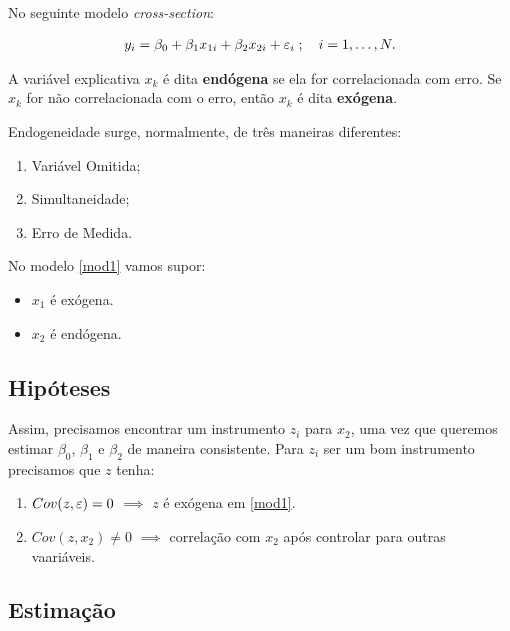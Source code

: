 \documentclass[11pt,oneside,a4paper]{article}
\numberwithin{equation}{section}
\begin{document}
No seguinte modelo \textit{cross-section}:

\vspace{-1 em}
\begin{align} \label{mod1}
	y_{i} = \beta_{0} + \beta_{1} x_{1i} + \beta_{2} x_{2i} + \varepsilon_{i}
	\; ; \quad i = 1, \dots, N.
\end{align}

\noindent
A variável explicativa $x_{k}$ é dita \textbf{endógena} se ela for correlacionada com erro.
Se $x_{k}$ for não correlacionada com o erro, então $x_{k}$ é dita \textbf{exógena}.

Endogeneidade surge, normalmente, de três maneiras diferentes:

\begin{enumerate}\itemsep0pt
	\item Variável Omitida;
	\item Simultaneidade;
	\item Erro de Medida.
\end{enumerate}

No modelo \eqref{mod1} vamos supor:

\begin{itemize}\itemsep0pt
	\item $x_{1}$ é exógena.
	\item $x_{2}$ é endógena.
\end{itemize}

\subsection*{Hipóteses}

Assim, precisamos encontrar um instrumento $z_{i}$ para $x_{2}$, uma vez que queremos estimar $\beta_{0}$, $\beta_{1}$ e $\beta_{2}$ de maneira consistente.
Para $z_{i}$ ser um bom instrumento precisamos que $z$ tenha:

\begin{enumerate}\itemsep0pt
\item $Cov(z, \varepsilon) = 0$ $\implies$  $z$ é exógena em \eqref{mod1}.
\item $Cov(z, x_{2}) \neq 0$ $\implies$  correlação com $x_{2}$ após controlar para outras vaariáveis.
\end{enumerate}

\subsection*{Estimação}
\end{document}
